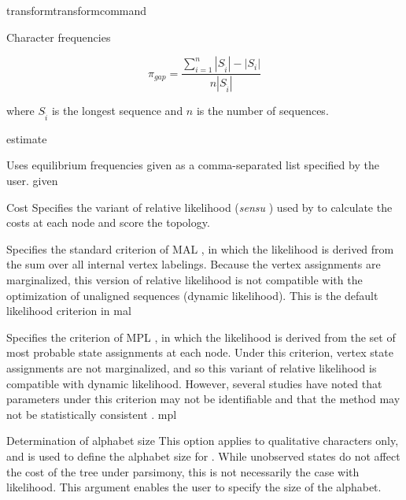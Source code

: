 \begin{command}{transform}{transformcommand}
\begin{arguments}
\begin{argumentgroup} {Character frequencies}
{\begin{equation*}
\pi_{gap} = \frac{\sum_{i=1}^n
|S_{\hat{i}}| - |S_i|}{n |S_{\hat{i}}|}
\end{equation*}

where
$S_{\hat{i}}$ is the longest sequence and $n$ is the number of sequences.}
{estimate}

{Uses equilibrium frequencies given as a
comma-separated list specified by the user.} 
{given}

\end{argumentgroup}


\begin {argumentgroup} {Cost}
Specifies the variant of relative likelihood (\textit{sensu}
\cite{steel2000parsimony}) used by \poy to calculate the costs at
each node and score the topology.

{Specifies the standard criterion of MAL \cite{felsenstein1981}, in which the
likelihood is derived from the sum over all internal
vertex labelings. Because the vertex assignments are
marginalized, this version of relative likelihood is not
compatible with the optimization of unaligned sequences (dynamic likelihood).
This is the default likelihood criterion in \poy}
{mal}

{Specifies the criterion of MPL \cite{barryandhartigan1987}, in which the likelihood is
derived from the set of most probable state assignments
at each node. Under this criterion, vertex state
assignments are not marginalized, and so this variant of
relative likelihood is compatible with dynamic
likelihood. However, several studies have noted that
parameters under this criterion may not be identifiable
\cite{zou2011} and that the method may not be statistically consistent
\cite{mossel2009shrinkage}.}
{mpl}

\end{argumentgroup}


\begin{argumentgroup}{Determination of alphabet size}
This option applies to qualitative characters only, and is used to
define the alphabet size for . While unobserved 
states do not affect the cost of the tree under parsimony, this is not 
necessarily the case with likelihood. 
This argument enables the user to specify the size of the alphabet.


\end{argumentgroup}
\end{arguments}
\end{command}
